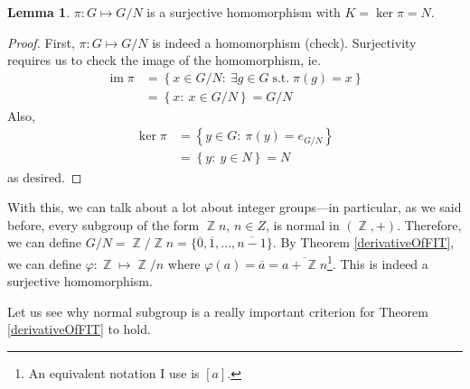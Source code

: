 \documentclass[11pt]{amsart} %
\theoremstyle{definition}
\newtheorem{lemma}[definition]{Lemma}
\theoremstyle{definition}
\DeclareMathOperator{\Z}{\mathbb{Z}}
\DeclareMathOperator{\suchthat}{\text{ s.t. }}
\DeclareMathOperator{\im}{im}
\numberwithin{equation}{section}
\newcommand{\condset}[4]{\left\{ #1  : \: #2 #3 #4 \right\}}
\newcommand{\qgroup}[2]{#1 / #2}
\begin{document}
\begin{lemma}
	$\pi: G \mapsto \qgroup{G}{N}$ is a surjective homomorphism with $K= \ker \pi = N$.
\end{lemma}

\begin{proof}
	First, $\pi: G \mapsto \qgroup{G}{N}$ is indeed a homomorphism (check). Surjectivity requires us to check the image of the homomorphism, ie.
	\begin{align*}
	\im \pi  &= \condset{x \in \qgroup{G}{N}}{\exists g \in G \suchthat  \pi (g) }{ = }{x}  \\
	&= \condset{ x}{x }{\in}{ \qgroup{G}{N} } = \qgroup{G}{N}
	\end{align*}
	Also,
	\begin{align*}
	\ker \pi &= \condset{y \in G}{ \pi (y)}{ = }{e_{\qgroup{G}{N}} } \\
	&= \condset{y}{y}{\in}{N} = N
	\end{align*}
	as desired.
\end{proof}

With this, we can talk about a lot about integer groups---in particular, as we said before, every subgroup of the form $\Z n$, $n \in Z$, is normal in $(\Z, +)$. Therefore, we can define $G/ N = \Z / \Z n = \{ \overline{0}, \overline{1}, \dots, \overline{n-1} \}$. By Theorem \ref{derivativeOfFIT}, we can define $\varphi : \Z \mapsto \Z /n$ where $\varphi(a)= \overline{a} = \overline{a + \Z n}$\footnote{An equivalent notation I use is $[a]$.}. This is indeed a surjective homomorphism.

Let us see why normal subgroup is a really important criterion for Theorem \ref{derivativeOfFIT} to hold.
\end{document}
